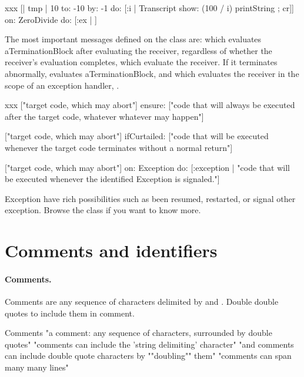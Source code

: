 \documentclass[a4paper,10pt,twoside]{book}
\begin{document}
\begin{script}[xxx]{xxx}
[| tmp |
10 to: -10 by: -1 do: [:i | Transcript show: (100 / i) printString ; cr]]
   on: ZeroDivide
   do: [:ex |  ]
\end{script}

The most important messages defined on the class  are:
 which evaluates aTerminationBlock after evaluating the receiver, regardless of whether the receiver's evaluation completes,  which evaluate the receiver. If it terminates abnormally, evaluates aTerminationBlock, and  which evaluates the receiver in the scope of an exception handler, .

\begin{script}[xxx]{xxx}
["target code, which may abort"]
   ensure:
      ["code that will always be executed after the target code,
      whatever whatever may happen"]

["target code, which may abort"]
   ifCurtailed:
      ["code that will be executed whenever the
      target code terminates without a normal return"]

["target code, which may abort"]
   on: Exception
   do:
      [:exception |
      "code that will be executed whenever the identified Exception
      is signaled."]
\end{script}

Exception have rich possibilities such as been resumed, restarted, or
signal other exception. Browse the class  if you want
to know more.




\section{Comments and identifiers}
\paragraph{Comments.}


Comments are any sequence of characters delimited by  and . Double double quotes to include them in comment.


\begin{script}{Comments}
"a comment:  any sequence of characters, surrounded by double quotes"
"comments can include the 'string delimiting' character"
"and comments can include double quote characters by ""doubling"" them"
"comments can span many
many
lines"
\end{script}
\end{document}
